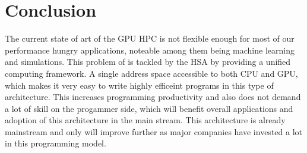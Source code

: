 \section{Conclusion}

The current state of art of the GPU HPC is not flexible enough for most of our
performance hungry applications, noteable among them being machine learning and
simulations. This problem of is tackled by the HSA by providing a unified
computing framework. A single address space accessible to both CPU and GPU,
which makes it very easy to write highly efficeint programs in this type of
architecture. This increases programming productivity and also does not demand
a lot of skill on the progammer side, which will benefit overall applications
and adoption of this architecture in the main stream. This architecture is
already mainstream and only will improve further as major companies have
invested a lot in this programming model.
